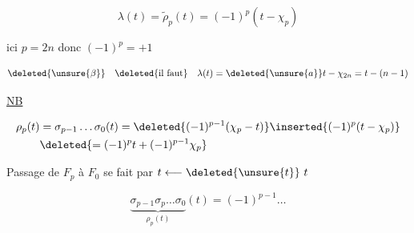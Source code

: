 
\[ \lambda(t)=\widetilde\rho_p(t)=(-1)^p(t-\chi_p) \]

ici $p=2n$ donc $(-1)^p=+1$

\[ \deleted{\unsure{\beta}} \quad \deleted{\text{il faut}}\quad \lambda(t)=\deleted{\unsure{a}}t-\chi_{2n}=t-(n-1) \]

\uline{NB}

\[ \begin{aligned}
\rho_p(t)&=\sigma_{p-1}\ldots\sigma_0(t)=\deleted{(-1)^{p-1}(\chi_p-t)}\inserted{(-1)^p(t-\chi_p)}\\
&\deleted{=(-1)^p t+(-1)^{p-1}\chi_p}
\end{aligned} \]

Passage de $F_p$ à $F_0$ se fait par $t\longleftarrow\deleted{\unsure{t}}\ t$ 

\[ \underbrace{\sigma_{p-1}\sigma_p\ldots\sigma_0}_{\rho_p(t)}(t)=(-1)^{p-1}\ldots \]

